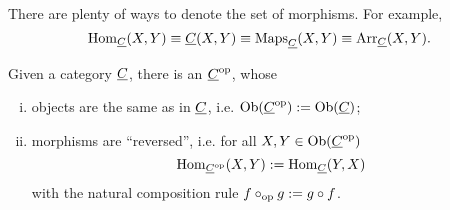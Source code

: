 \begin{remark*}
	There are plenty of ways to denote the set of morphisms. For example,
	\[
		\operatorname{Hom}_{\underline{C}}(X, Y) \equiv \underline{C}(X, Y) \equiv \operatorname{Maps}_{\underline{C}}(X, Y) \equiv \operatorname{Arr}_{\underline{C}}(X, Y).
	\]
\end{remark*}

\begin{definition*}
	Given a category \( \underline{C} \), there is an  \( \underline{C}^\mathrm{op} \), whose
	\begin{enumerate}[(i)]
		\item objects are the same as in \( \underline{C} \), i.e. \( \operatorname{Ob}(\underline{C}^\mathrm{op}) := \operatorname{Ob}(\underline{C}) \);
		\item morphisms are \enquote{reversed}, i.e. for all \( X, Y \in \operatorname{Ob}(\underline{C}^\mathrm{op}) \)
			\[
				\operatorname{Hom}_{\underline{C}^\mathrm{op}}(X, Y) := \operatorname{Hom}_{\underline{C}}(Y, X)
			\]
			with the natural composition rule \( f \circ_\mathrm{op} g := g \circ f \).
	\end{enumerate}
\end{definition*}

